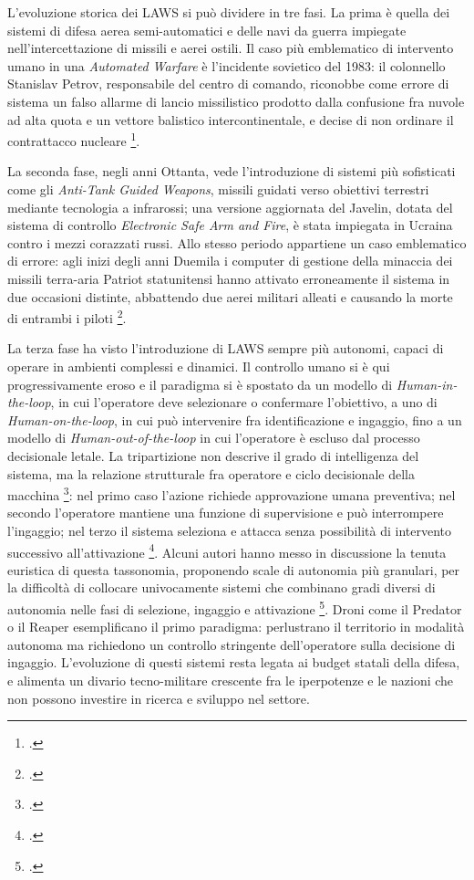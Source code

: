 \documentclass[a4paper,12pt]{report}
\begin{document}
L'evoluzione storica dei LAWS si può dividere in tre fasi. La prima è quella dei
sistemi di difesa aerea semi-automatici e delle navi da guerra impiegate
nell'intercettazione di missili e aerei ostili. Il caso più emblematico di
intervento umano in una \textit{Automated Warfare} è l'incidente sovietico del
1983: il colonnello Stanislav Petrov, responsabile del centro di comando,
riconobbe come errore di sistema un falso allarme di lancio missilistico
prodotto dalla confusione fra nuvole ad alta quota e un vettore balistico
intercontinentale, e decise di non ordinare il contrattacco nucleare \footcite{hoffman_1999_petrov}.
 
La seconda fase, negli anni Ottanta, vede l'introduzione di sistemi più
sofisticati come gli \textit{Anti-Tank Guided Weapons}, missili guidati verso
obiettivi terrestri mediante tecnologia a infrarossi; una versione aggiornata
del Javelin, dotata del sistema di controllo \textit{Electronic Safe Arm and
Fire}, è stata impiegata in Ucraina contro i mezzi corazzati russi. Allo stesso
periodo appartiene un caso emblematico di errore: agli inizi degli anni Duemila
i computer di gestione della minaccia dei missili terra-aria Patriot statunitensi
hanno attivato erroneamente il sistema in due occasioni distinte, abbattendo due
aerei militari alleati e causando la morte di entrambi i piloti
\footcite{horowitz_kahn_2024}.
 
La terza fase ha visto l'introduzione di LAWS sempre più autonomi, capaci di
operare in ambienti complessi e dinamici. Il controllo umano si è qui
progressivamente eroso e il paradigma si è spostato da un modello di
\textit{Human-in-the-loop}, in cui l'operatore deve selezionare o confermare
l'obiettivo, a uno di \textit{Human-on-the-loop}, in cui può intervenire fra
identificazione e ingaggio, fino a un modello di \textit{Human-out-of-the-loop}
in cui l'operatore è escluso dal processo decisionale letale. La
tripartizione non descrive il grado di intelligenza del sistema, ma la relazione
strutturale fra operatore e ciclo decisionale della macchina
\footcite{horowitz_scharre_2015}: nel primo caso l'azione richiede approvazione
umana preventiva; nel secondo l'operatore mantiene una funzione di supervisione
e può interrompere l'ingaggio; nel terzo il sistema seleziona e attacca senza
possibilità di intervento successivo all'attivazione \footcite{kallenborn_2021}.
Alcuni autori hanno messo in discussione la tenuta euristica di questa
tassonomia, proponendo scale di autonomia più granulari, per la difficoltà di
collocare univocamente sistemi che combinano gradi diversi di autonomia nelle
fasi di selezione, ingaggio e attivazione \footcite{sharkey_2016}. Droni come
il Predator o il Reaper esemplificano il primo paradigma: perlustrano il
territorio in modalità autonoma ma richiedono un controllo stringente
dell'operatore sulla decisione di ingaggio. L'evoluzione di questi sistemi resta
legata ai budget statali della difesa, e alimenta un divario tecno-militare
crescente fra le iperpotenze e le nazioni che non possono investire in ricerca e
sviluppo nel settore.
 
\end{document}

